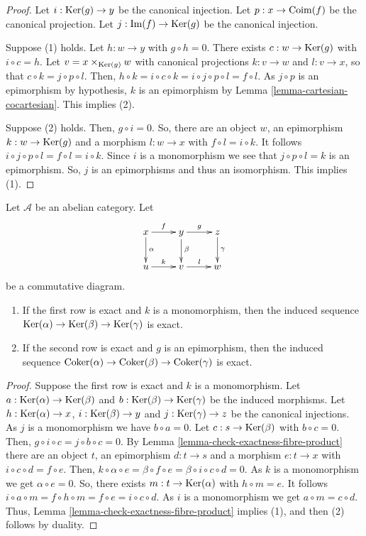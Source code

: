 \begin{proof}
Let $i:\mathop{\mathrm{Ker}}(g)\to y$ be the canonical
injection. Let
$p:x\to\mathop{\mathrm{Coim}}(f)$ be the canonical projection.
Let
$j:\mathop{\mathrm{Im}}(f)\to\mathop{\mathrm{Ker}}(g)$ be the canonical
injection.

\medskip\noindent
Suppose (1) holds. Let $h:w\to y$ with
$g\circ h=0$. There exists
$c:w\to\mathop{\mathrm{Ker}}(g)$ with $i\circ c=h$.
Let $v=x\times_{\mathop{\mathrm{Ker}}(g)}w$ with canonical
projections
$k:v\to w$ and $l:v\to x$, so that $c\circ
k=j\circ p\circ l$.
Then, $h\circ k=i\circ c\circ k=i\circ j\circ
p\circ l=f\circ l$.
As $j\circ p$ is an epimorphism by
hypothesis, $k$ is an
epimorphism by Lemma
\ref{lemma-cartesian-cocartesian}. This
implies (2).

\medskip\noindent
Suppose (2) holds. Then, $g\circ i=0$. So,
there are an object
$w$, an epimorphism $k:w\to\mathop{\mathrm{Ker}}(g)$ and a
morphism
$l:w\to x$ with $f\circ l=i\circ k$. It
follows
$i\circ j\circ p\circ l=f\circ l=i\circ k$.
Since $i$ is a
monomorphism we see that $j\circ p\circ l=k$
is an epimorphism.
So, $j$ is an epimorphisms and thus an
isomorphism. This implies (1).
\end{proof}

\begin{lemma}
\label{lemma-exact-kernel-sequence}
Let $\mathcal{A}$ be an abelian category. Let
$$
\xymatrix{
x \ar[r]^f \ar[d]^\alpha &
y \ar[r]^g \ar[d]^\beta &
z \ar[d]^\gamma\\
u \ar[r]^k & v \ar[r]^l & w
}
$$
be a commutative diagram.
\begin{enumerate}
\item If the first row is exact and $k$ is a
monomorphism, then the induced
sequence $\mathop{\mathrm{Ker}}(\alpha) \to \mathop{\mathrm{Ker}}(\beta) \to
\mathop{\mathrm{Ker}}(\gamma)$
is exact.
\item If the second row is exact and $g$ is
an epimorphism, then the induced
sequence
$\mathop{\mathrm{Coker}}(\alpha) \to \mathop{\mathrm{Coker}}(\beta) \to
\mathop{\mathrm{Coker}}(\gamma)$
is exact.
\end{enumerate}
\end{lemma}

\begin{proof}
Suppose the first row is exact and $k$ is a
monomorphism. Let
$a:\mathop{\mathrm{Ker}}(\alpha)\to\mathop{\mathrm{Ker}}(\beta)$ and
$b:\mathop{\mathrm{Ker}}(\beta)\to\mathop{\mathrm{Ker}}(\gamma)$ be the induced
morphisms.
Let $h:\mathop{\mathrm{Ker}}(\alpha)\to x$, $i:\mathop{\mathrm{Ker}}(\beta)\to
y$ and
$j:\mathop{\mathrm{Ker}}(\gamma)\to z$ be the canonical
injections. As $j$ is
a monomorphism we have $b\circ a=0$. Let
$c:s\to\mathop{\mathrm{Ker}}(\beta)$
with $b\circ c=0$. Then, $g\circ i\circ
c=j\circ b\circ c=0$. By
Lemma
\ref{lemma-check-exactness-fibre-product}
there are an object $t$, an
epimorphism $d:t\to s$ and a morphism $e:t\to
x$ with
$i\circ c\circ d=f\circ e$. Then,
$k\circ \alpha\circ e=\beta\circ f\circ
e=\beta\circ i\circ c\circ d=0$.
As $k$ is a monomorphism we get $\alpha\circ
e=0$. So, there exists
$m:t\to\mathop{\mathrm{Ker}}(\alpha)$ with $h\circ m=e$. It
follows
$i\circ a\circ m=f\circ h\circ m=f\circ
e=i\circ c\circ d$.
As $i$ is a monomorphism we get $a\circ
m=c\circ d$. Thus,
Lemma
\ref{lemma-check-exactness-fibre-product}
implies (1), and then
(2) follows by duality.
\end{proof}

